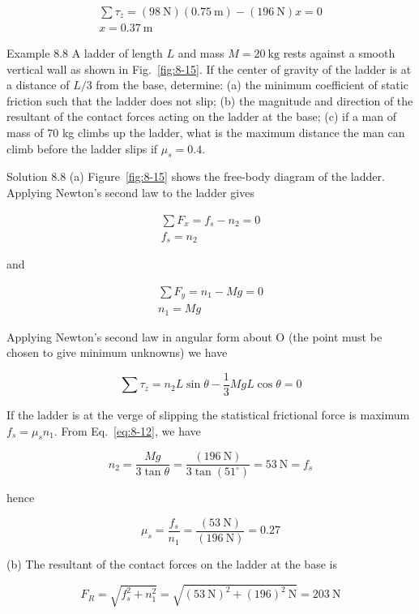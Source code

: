 \documentclass[10pt]{article}
\numberwithin{equation}{section}
\begin{document}
$$
\begin{gathered}
\sum \tau_{z}=(98 \mathrm{~N})(0.75 \mathrm{~m})-(196 \mathrm{~N}) x=0 \\
x=0.37 \mathrm{~m}
\end{gathered}
$$

Example 8.8 A ladder of length $L$ and mass $M=20 \mathrm{~kg}$ rests against a smooth vertical wall as shown in Fig.~\ref{fig:8-15}. If the center of gravity of the ladder is at a distance of $L / 3$ from the base, determine: (a) the minimum coefficient of static friction such that the ladder does not slip; (b) the magnitude and direction of the resultant of the contact forces acting on the ladder at the base; (c) if a man of mass of 70 kg climbs up the ladder, what is the maximum distance the man can climb before the ladder slips if $\mu_{s}=0.4$.

Solution 8.8 (a) Figure~\ref{fig:8-15} shows the free-body diagram of the ladder. Applying Newton's second law to the ladder gives

$$
\begin{gathered}
\sum F_{x}=f_{s}-n_{2}=0 \\
f_{s}=n_{2}
\end{gathered}
$$

and

$$
\begin{gathered}
\sum F_{y}=n_{1}-M g=0 \\
n_{1}=M g
\end{gathered}
$$

Applying Newton's second law in angular form about O (the point must be chosen to give minimum unknowns) we have


\begin{equation}
\sum \tau_{z}=n_{2} L \sin \theta-\frac{1}{3} M g L \cos \theta=0 \label{eq:8-12}
\end{equation}


If the ladder is at the verge of slipping the statistical frictional force is maximum $f_{s}=\mu_{s} n_{1}$. From Eq.~\eqref{eq:8-12}, we have

$$
n_{2}=\frac{M g}{3 \tan \theta}=\frac{(196 \mathrm{~N})}{3 \tan \left(51^{\circ}\right)}=53 \mathrm{~N}=f_{s}
$$

hence

$$
\mu_{s}=\frac{f_{s}}{n_{1}}=\frac{(53 \mathrm{~N})}{(196 \mathrm{~N})}=0.27
$$

(b) The resultant of the contact forces on the ladder at the base is

$$
F_{R}=\sqrt{f_{s}^{2}+n_{1}^{2}}=\sqrt{(53 \mathrm{~N})^{2}+(196)^{2} \mathrm{~N}}=203 \mathrm{~N}
$$
\end{document}
